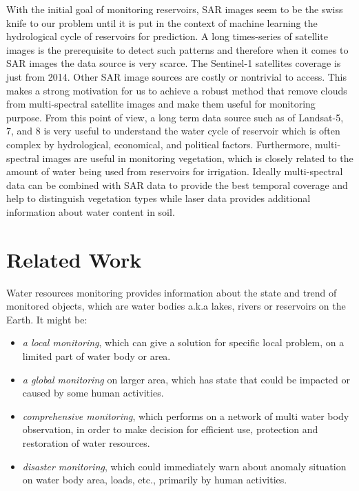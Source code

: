 With the initial goal of monitoring reservoirs, SAR images seem to be the swiss knife to our problem until it is put in the context of machine learning the hydrological cycle of reservoirs for prediction. A long times-series of satellite images is the prerequisite to detect such patterns and therefore when it comes to SAR images the data source is very scarce. The Sentinel-1 satellites coverage is just from 2014. Other SAR image sources are costly or nontrivial to access. This makes a strong motivation for us to achieve a robust  method that remove clouds from multi-spectral satellite images and make them useful for monitoring purpose. From this point of view, a long term data source such as of Landsat-5, 7, and 8 is very useful to understand the water cycle of reservoir which is often complex by hydrological, economical, and political factors. Furthermore, multi-spectral images are useful in monitoring vegetation, which is closely related to the amount of water being used from reservoirs for irrigation. Ideally multi-spectral data can be combined with SAR data to provide the best temporal coverage and help to distinguish vegetation types while laser data provides additional information about water content in soil. 


\section{Related Work} %



Water resources monitoring provides information about the state and trend of monitored objects, which are water bodies a.k.a lakes, rivers or reservoirs on the Earth. It might be:

\begin{itemize}
	\item \textit{a local monitoring}, which can give a solution for specific local problem, on a limited part of water body or area.
	\item \textit{a global monitoring} on larger area, which has state that could be impacted or caused by some human activities.
	\item \textit{comprehensive monitoring}, which performs on a network of multi water body observation, in order to make decision for efficient use, protection and restoration of water resources.
	\item \textit{disaster monitoring}, which could immediately warn about anomaly situation on water body area, loads, etc., primarily by human activities.
\end{itemize}


